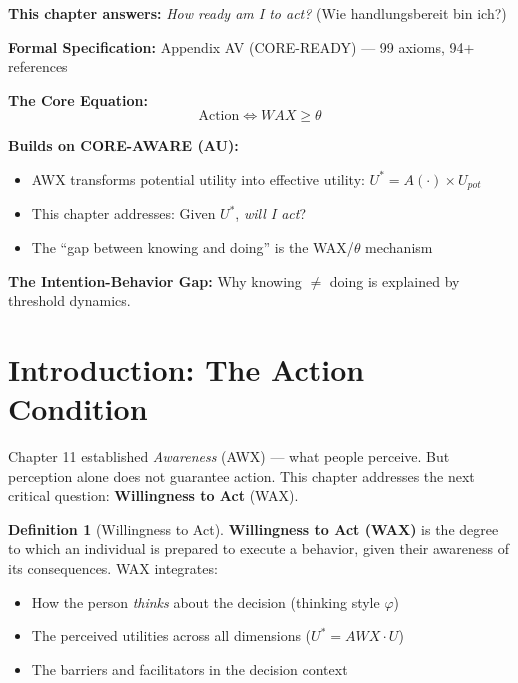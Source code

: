 \documentclass[11pt,a4paper]{book}
\theoremstyle{definition}
\newtheorem{definition}{Definition}[section]
\theoremstyle{remark}
\begin{document}
\begin{tcolorbox}[colback=purple!5!white, colframe=purple!75!black,
    title=\textbf{CORE-READY: The Seventh Fundamental Question (7C)}]
\textbf{This chapter answers:} \textit{How ready am I to act?} (Wie handlungsbereit bin ich?)

\textbf{Formal Specification:} Appendix AV (CORE-READY) — 99 axioms, 94+ references

\textbf{The Core Equation:}
\[
\boxed{\text{Action} \Leftrightarrow WAX \geq \theta}
\]

\textbf{Builds on CORE-AWARE (AU):}
\begin{itemize}[nosep]
    \item AWX transforms potential utility into effective utility: $U^* = A(\cdot) \times U_{pot}$
    \item This chapter addresses: Given $U^*$, \textit{will I act}?
    \item The ``gap between knowing and doing'' is the WAX/$\theta$ mechanism
\end{itemize}

\textbf{The Intention-Behavior Gap:} Why knowing $\neq$ doing is explained by threshold dynamics.
\end{tcolorbox}

\section{Introduction: The Action Condition}
\label{sec:12-intro}

Chapter 11 established \textit{Awareness} (AWX) — what people perceive. But perception alone does not guarantee action. This chapter addresses the next critical question: \textbf{Willingness to Act} (WAX).

\begin{definition}[Willingness to Act]
\textbf{Willingness to Act (WAX)} is the degree to which an individual is prepared to execute a behavior, given their awareness of its consequences. WAX integrates:
\begin{itemize}
\item How the person \textit{thinks} about the decision (thinking style $\varphi$)
\item The perceived utilities across all dimensions ($U^* = AWX \cdot U$)
\item The barriers and facilitators in the decision context
\end{itemize}
\end{definition}
\end{document}
